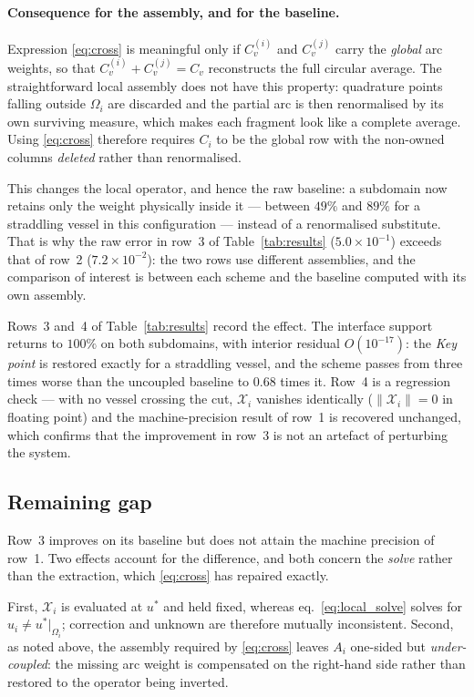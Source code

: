 \paragraph{Consequence for the assembly, and for the baseline.}
Expression \eqref{eq:cross} is meaningful only if $C_v^{(i)}$ and $C_v^{(j)}$
carry the \emph{global} arc weights, so that $C_v^{(i)} + C_v^{(j)} = C_v$
reconstructs the full circular average. The straightforward local assembly does
not have this property: quadrature points falling outside $\Omega_i$ are
discarded and the partial arc is then renormalised by its own surviving
measure, which makes each fragment look like a complete average. Using
\eqref{eq:cross} therefore requires $C_i$ to be the global row with the
non-owned columns \emph{deleted} rather than renormalised.

This changes the local operator, and hence the raw baseline: a subdomain now
retains only the weight physically inside it --- between $49\%$ and $89\%$ for
a straddling vessel in this configuration --- instead of a renormalised
substitute. That is why the raw error in row~3 of Table~\ref{tab:results}
($5.0\times10^{-1}$) exceeds that of row~2 ($7.2\times10^{-2}$): the two rows
use different assemblies, and the comparison of interest is between each scheme
and the baseline computed with its own assembly.

Rows~3 and~4 of Table~\ref{tab:results} record the effect. The interface support
returns to $100\%$ on both subdomains, with interior residual $O(10^{-17})$: the
\emph{Key point} is restored exactly for a straddling vessel, and the scheme
passes from three times worse than the uncoupled baseline to $0.68$ times it.
Row~4 is a regression check --- with no vessel crossing the cut,
$\mathcal{X}_i$ vanishes identically ($\|\mathcal{X}_i\| = 0$ in floating
point) and the machine-precision result of row~1 is recovered unchanged, which
confirms that the improvement in row~3 is not an artefact of perturbing the
system.

\subsection{Remaining gap}

Row~3 improves on its baseline but does not attain the machine precision of
row~1. Two effects account for the difference, and both concern the
\emph{solve} rather than the extraction, which \eqref{eq:cross} has repaired
exactly.

First, $\mathcal{X}_i$ is evaluated at $u^*$ and held fixed, whereas
eq.~\eqref{eq:local_solve} solves for $u_i \neq u^*|_{\Omega_i}$; correction and
unknown are therefore mutually inconsistent. Second, as noted above, the
assembly required by \eqref{eq:cross} leaves $A_i$ one-sided but
\emph{under-coupled}: the missing arc weight is compensated on the right-hand
side rather than restored to the operator being inverted.

